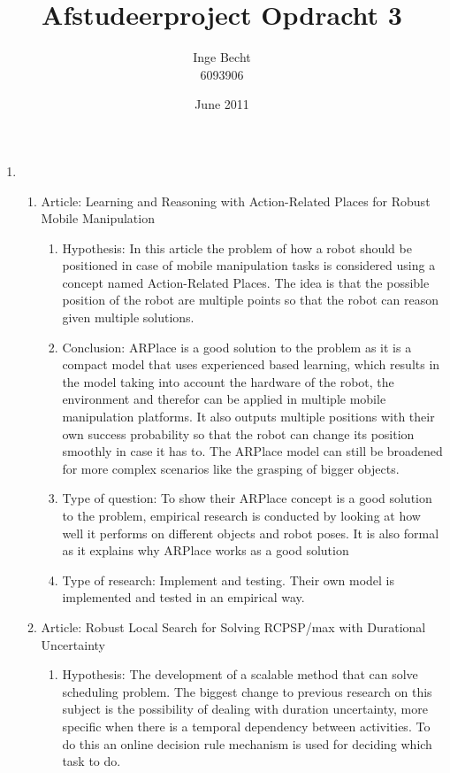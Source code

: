 \documentclass{article}
\title{Afstudeerproject Opdracht 3}
\author{Inge Becht \\ 6093906}
\date{June 2011}
\begin{document}
\maketitle

\begin{enumerate}
\item{ 
    \begin{enumerate}
        \item {Article: Learning and Reasoning with Action-Related Places for Robust Mobile Manipulation
        \begin{enumerate}
            \item Hypothesis: In this article the problem of how a robot should be positioned in case of mobile manipulation tasks is considered using a concept named Action-Related Places. The idea is that the possible position of the robot are multiple points so that the robot can reason given multiple solutions.
            \item Conclusion: ARPlace is a good solution to the problem as it is a compact model that uses experienced based learning, which results in the model taking into account the hardware of the robot, the environment and therefor can be applied in multiple mobile manipulation platforms. It also outputs multiple positions with their own success probability so that the robot can change its position smoothly in case it has to. The ARPlace model can still be broadened for more complex scenarios like the grasping of bigger objects.
            \item Type of question: To show their ARPlace concept is a good solution to the problem, empirical research is conducted by looking at how well it performs on different objects and robot poses. It is also formal as it explains why ARPlace works as a good solution 
            \item Type of research: Implement and testing. Their own model is implemented and tested in an empirical way.
        \end{enumerate}
        }
        \item {Article: Robust Local Search for Solving RCPSP/max with
Durational Uncertainty
        \begin{enumerate}
            \item Hypothesis: The development of a scalable method that can solve scheduling problem. The biggest change to previous research on this subject is the possibility of dealing with duration uncertainty, more specific when there is a temporal dependency between activities. To do this an online decision rule mechanism is used for deciding which task to do. 

\end{enumerate}}
\end{enumerate}}
\end{enumerate}
\end{document}
